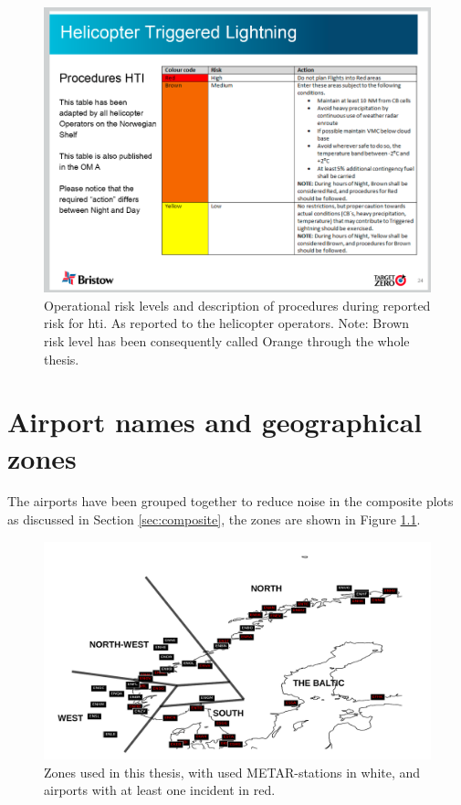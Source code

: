 \begin{figure}
    \centering
    \includegraphics[width=\textwidth]{Figures/ProsedyrerHTI2016.png}
    \caption{Operational risk levels and description of procedures during reported risk for \acrshort{hti}. As reported to the helicopter operators. Note: Brown risk level has been consequently called Orange through the whole thesis.}
    \label{fig:HTIRISK}
\end{figure}

\chapter{Airport names and geographical zones}\label{app:B}
The airports have been grouped together to reduce noise in the composite plots as discussed in Section \ref{sec:composite}, the zones are shown in Figure \ref{fig:Stationsmap}. 
\begin{figure}
    \centering
    \includegraphics[width=\textwidth]{Figures/METARandHIT.pdf}
    \caption{Zones used in this thesis, with used METAR-stations in white, and airports with at least one incident in red.}
    \label{fig:Stationsmap}
\end{figure}

